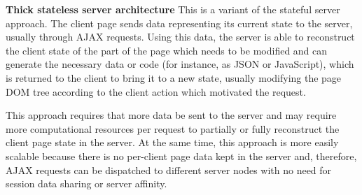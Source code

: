 \textbf{Thick stateless server architecture}
This is a variant of the stateful server approach. The client page sends data representing its current state to the server, usually through AJAX requests. Using this data, the server is able to reconstruct the client state of the part of the page which needs to be modified and can generate the necessary data or code (for instance, as JSON or JavaScript), which is returned to the client to bring it to a new state, usually modifying the page DOM tree according to the client action which motivated the request.

This approach requires that more data be sent to the server and may require more computational resources per request to partially or fully reconstruct the client page state in the server. At the same time, this approach is more easily scalable because there is no per-client page data kept in the server and, therefore, AJAX requests can be dispatched to different server nodes with no need for session data sharing or server affinity. \cite{arc_over}